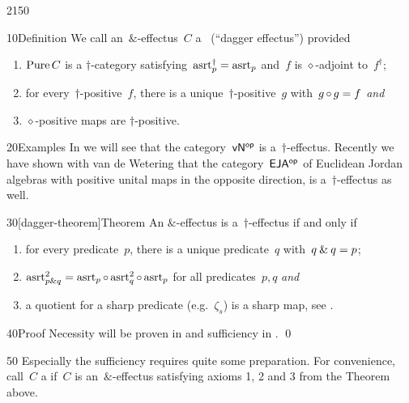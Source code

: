 \begin{parsec}{2150}%
\begin{point}{10}{Definition}%
We call an~$\&$-effectus~$C$
    a~ (``dagger effectus'') provided
\begin{enumerate}
\item
    $\operatorname{Pure} C$ is a  $\dagger$-category
     satisfying~$\mathrm{asrt}_p^\dagger = \mathrm{asrt}_p$
        and~$f$ is $\diamond$-adjoint to~$f^\dagger$;
\item
    for every~$\dagger$-positive~$f$,
        there is a unique~$\dagger$-positive~$g$
        with~$g \mathop{\circ} g = f$ \emph{and}
\item
    $\diamond$-positive maps are $\dagger$-positive.
\end{enumerate}
\end{point}
\spacingfix{}
\begin{point}{20}{Examples}%
In 
we will see that the category~${\mathsf{vN}}{^{\mathsf{op}}}$ is a~$\dagger$-effectus.
Recently we have shown with van de Wetering
    that the category~${\mathsf{EJA}}{^{\mathsf{op}}}$
    of Euclidean Jordan algebras
    with positive unital maps in the opposite direction,
    is a~$\dagger$-effectus as well. \cite{eja}
\end{point}
\begin{point}{30}[dagger-theorem]{Theorem}%
    An $\&$-effectus
        is a~$\dagger$-effectus if and only if
\begin{enumerate}
\item
for every predicate~$p$, there is a unique predicate~$q$
    with~$q \mathbin{\&} q = p$;
\item
    $\mathrm{asrt}^2_{p \mathbin{\&} q}
        = \mathrm{asrt}_p \mathop{\circ} \mathrm{asrt}^2_q \mathop{\circ} \mathrm{asrt}_p$
     for all predicates~$p,q$ \emph{and}
\item
    a quotient for a sharp predicate (e.g.~$\zeta_s$)
    is a sharp map, see .
\end{enumerate}
\spacingfix{}
\begin{point}{40}{Proof}%
Necessity will be proven in
        and sufficiency in . \qed
\end{point}
\begin{point}{50}%
Especially the sufficiency requires quite some preparation.
For convenience, call~$C$ a 
    if~$C$ is an~$\&$-effectus
    satisfying axioms 1, 2 and 3 from the Theorem above.

\end{point}
\end{point}
\end{parsec}
